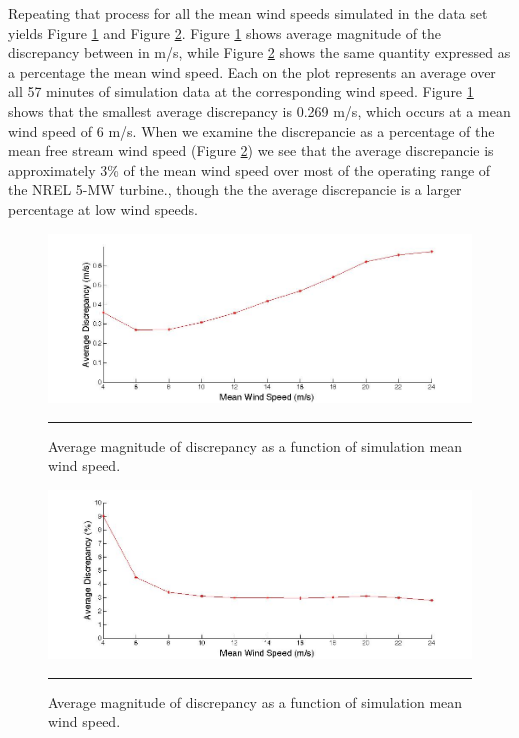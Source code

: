 Repeating that process for all the mean wind speeds simulated in the data set yields Figure \ref{fig2-11} and Figure \ref{fig2-12}. Figure \ref{fig2-11} shows average magnitude of the discrepancy between in m/s, while Figure \ref{fig2-12} shows the same quantity expressed as a percentage the mean wind speed. Each \* on the plot represents an average over all 57 minutes of simulation data at the corresponding wind speed. Figure \ref{fig2-11} shows that the smallest average discrepancy is 0.269 m/s, which occurs at a mean wind speed of  6 m/s. When we examine the discrepancie as a percentage of the mean free stream wind speed  (Figure \ref{fig2-12}) we see that the average discrepancie is approximately 3\% of the mean wind speed over most of the operating range of the NREL 5-MW turbine., though the the average discrepancie is a larger percentage at low wind speeds.

\begin{figure}[htbp]
	\centering
		\includegraphics[trim = {3cm 0 2.5cm 0}, clip, width = \linewidth]{Figures/ch2Figures/fig2-11.jpg}
		\rule{35em}{0.5pt}
	\caption{Average magnitude of discrepancy as a function of simulation mean wind speed.}
	\label{fig2-11}
\end{figure}

\begin{figure}[htbp]
	\centering
		\includegraphics[trim = {3cm 0 2.5cm 0}, clip, width = \linewidth]{Figures/ch2Figures/fig2-12.jpg}
		\rule{35em}{0.5pt}
	\caption{Average magnitude of discrepancy as a function of simulation mean wind speed.}
	\label{fig2-12}
\end{figure}



